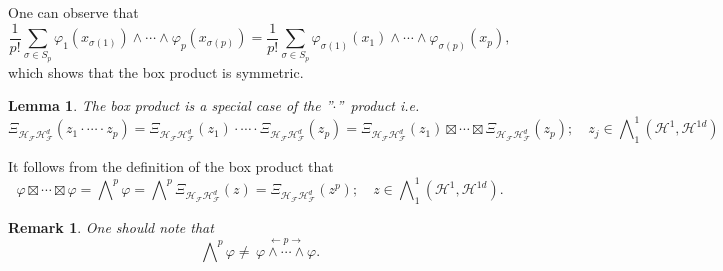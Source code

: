 \documentclass[aps,preprint]{revtex4}%
\newtheorem{lemma}[theorem]{Lemma}
\newtheorem{remark}[theorem]{Remark}
\begin{document}
One can observe that
\begin{equation}
\frac{1}{p!}\sum_{\sigma\in S_{p}}\varphi_{1}\left(  x_{\sigma\left(
1\right)  }\right)  \wedge\cdots\wedge\varphi_{p}\left(  x_{\sigma\left(
p\right)  }\right)  =\frac{1}{p!}\sum_{\sigma\in S_{p}}\varphi_{\sigma\left(
1\right)  }\left(  x_{1}\right)  \wedge\cdots\wedge\varphi_{\sigma\left(
p\right)  }\left(  x_{p}\right)  ,
\end{equation}
which shows that the box product is symmetric.

\begin{lemma}
The box product is a special case of the \textquotedblright$\cdot
$\textquotedblright\ product i.e.
\begin{equation}
\Xi_{\mathcal{H}_{\mathcal{F}}\mathcal{H}_{\mathcal{F}}^{d}}\left(  z_{1}%
\cdot\cdots\cdot z_{p}\right)  =\Xi_{\mathcal{H}_{\mathcal{F}}\mathcal{H}%
_{\mathcal{F}}^{d}}\left(  z_{1}\right)  \cdot\cdots\cdot\Xi_{\mathcal{H}%
_{\mathcal{F}}\mathcal{H}_{\mathcal{F}}^{d}}\left(  z_{p}\right)
=\Xi_{\mathcal{H}_{\mathcal{F}}\mathcal{H}_{\mathcal{F}}^{d}}\left(
z_{1}\right)  \boxtimes\cdots\boxtimes\Xi_{\mathcal{H}_{\mathcal{F}%
}\mathcal{H}_{\mathcal{F}}^{d}}\left(  z_{p}\right)  ;\quad z_{j}\in%
{\textstyle\bigwedge\nolimits_{1}^{1}}
\left(  \mathcal{H}^{1},\mathcal{H}^{1d}\right)
\end{equation}

\end{lemma}

It follows from the definition of the box product that
\begin{equation}
\varphi\boxtimes\cdots\boxtimes\varphi=%
{\textstyle\bigwedge\nolimits^{p}}
\varphi=%
{\textstyle\bigwedge\nolimits^{p}}
\Xi_{\mathcal{H}_{\mathcal{F}}\mathcal{H}_{\mathcal{F}}^{d}}\left(  z\right)
=\Xi_{\mathcal{H}_{\mathcal{F}}\mathcal{H}_{\mathcal{F}}^{d}}\left(
z^{p}\right)  ;\quad z\in%
{\textstyle\bigwedge\nolimits_{1}^{1}}
\left(  \mathcal{H}^{1},\mathcal{H}^{1d}\right)  .
\end{equation}


\begin{remark}
One should note that
\begin{equation}%
{\textstyle\bigwedge\nolimits^{p}}
\varphi\neq\,\overset{\longleftarrow p\longrightarrow}{\varphi\wedge
\cdots\wedge\varphi}.
\end{equation}

\end{remark}
\end{document}
